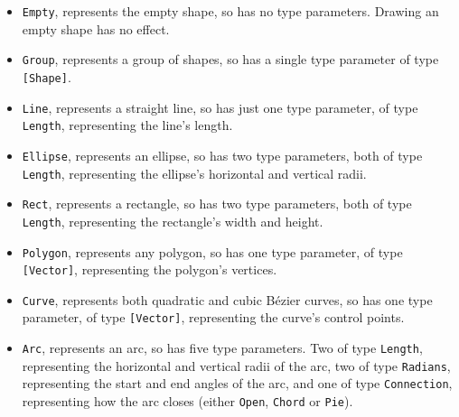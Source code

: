 \documentclass[../main.tex]{subfiles}
\begin{document}
                \begin{itemize}
                    \item \texttt{Empty}, represents the empty shape, so has no type parameters.
                          Drawing an empty shape has no effect.
                    \item \texttt{Group}, represents a group of shapes, so has a single type
                          parameter of type \texttt{[Shape]}.
                    \item \texttt{Line}, represents a straight line, so has just one type
                          parameter, of type \texttt{Length}, representing the line's length.
                    \item \texttt{Ellipse}, represents an ellipse, so has two type parameters, both of
                          type \texttt{Length}, representing the ellipse's horizontal and vertical radii.
                    \item \texttt{Rect}, represents a rectangle, so has two type parameters, both of type
                          \texttt{Length}, representing the rectangle's width and height.
                    \item \texttt{Polygon}, represents any polygon, so has one type parameter, of type
                          \texttt{[Vector]}, representing the polygon's vertices.
                    \item \texttt{Curve}, represents both quadratic and cubic Bézier curves, so has
                          one type parameter, of type \texttt{[Vector]}, representing the curve's control
                          points.
                    \item \texttt{Arc}, represents an arc, so has five type parameters.
                          Two of type \texttt{Length}, representing the horizontal and vertical radii of
                              the arc, two of type \texttt{Radians}, representing the start and end angles of
                              the arc, and one of type \texttt{Connection}, representing how the arc closes
                              (either \texttt{Open}, \texttt{Chord} or \texttt{Pie}).
                \end{itemize}
\end{document}
